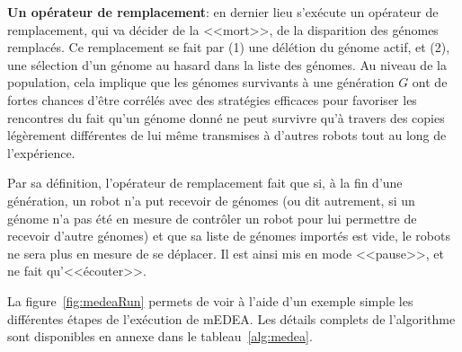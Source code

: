 \documentclass[a4paper,10pt]{report}
\begin{document}
\textbf{Un opérateur de remplacement}: en dernier lieu s'exécute un opérateur de remplacement, qui va décider de la <<mort>>, de la disparition des génomes remplacés. Ce remplacement se fait par (1) une délétion du génome actif, et (2), une sélection d'un génome au hasard dans la liste des génomes. Au niveau de la population, cela implique que les génomes survivants à une génération $G$ ont de fortes chances d'être corrélés avec des stratégies efficaces pour favoriser les rencontres du fait qu'un génome donné ne peut survivre qu'à travers des copies légèrement différentes de lui même transmises à d'autres robots tout au long de l'expérience.

Par sa définition, l'opérateur de remplacement fait que si, à la fin d'une génération, un robot n'a put recevoir de génomes (ou dit autrement, si un génome n'a pas été en mesure de contrôler un robot pour lui permettre de recevoir d'autre génomes) et que sa liste de génomes importés est vide, le robots ne sera plus en mesure de se déplacer. Il est ainsi mis en mode <<pause>>, et ne fait qu'<<écouter>>. 

La figure~\ref{fig:medeaRun} permets de voir à l'aide d'un exemple simple les différentes étapes de l'exécution de mEDEA. Les détails complets de l'algorithme sont disponibles en annexe dans le tableau~\ref{alg:medea}. 


\end{document}
